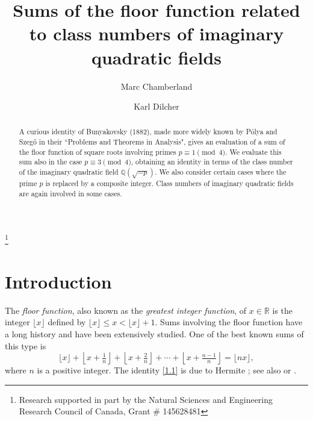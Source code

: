 \documentclass{amsart}
\theoremstyle{plain}
\numberwithin{equation}{section}
\begin{document}
\title[Sums of the floor function]{Sums of the floor function related to class 
numbers of imaginary quadratic fields}

\author{Marc Chamberland}
\address{Department of Mathematics and Statistics, Grinnell College,
Grinnell, IA 50112, USA}
%
\author{Karl Dilcher}
\address{Department of Mathematics and Statistics,
         Dalhousie University,
         Halifax, Nova Scotia, B3H 4R2, Canada}
%
\thanks{Research supported in part by the Natural Sciences and Engineering
        Research Council of Canada, Grant \# 145628481}

\date{}

\setcounter{equation}{0}

\begin{abstract}
A curious identity of Bunyakovsky (1882), made more widely known by P\'olya and
Szeg{\H o} in their ``Problems and Theorems in Analysis", gives an evaluation
of a sum of the floor function of square roots involving primes
$p\equiv 1\pmod{4}$. We evaluate this sum also in the case $p\equiv 3\pmod{4}$,
obtaining an identity in terms of the class number of the imaginary quadratic
field ${\mathbb Q}(\sqrt{-p})$. We also consider certain cases where the prime
$p$ is replaced by a composite integer. Class numbers of imaginary quadratic
fields are again involved in some cases.


\end{abstract}

\maketitle

\section{Introduction}\label{sec:1}

The {\it floor function}, also known as the {\it greatest integer function\/}, 
of $x\in{\mathbb R}$ is the integer $\lfloor{x}\rfloor$ defined by
$\lfloor{x}\rfloor\leq x < \lfloor{x}\rfloor+1$.
Sums involving the floor function have a long history and have been extensively
studied. One of the best known sums of this type is
\begin{equation}\label{1.1}
\lfloor{x}\rfloor+\left\lfloor{x+\tfrac{1}{n}}\right\rfloor+
\left\lfloor{x+\tfrac{2}{n}}\right\rfloor
+\cdots+\left\lfloor{x+\tfrac{n-1}{n}}\right\rfloor = \lfloor{nx}\rfloor,
\end{equation}
where $n$ is a positive integer. The identity \eqref{1.1} is
due to Hermite \cite[p.~315]{He}; see also \cite[p.~85]{GKP} or 
\cite[Part~8, Problem~9]{PS2}.
\end{document}
